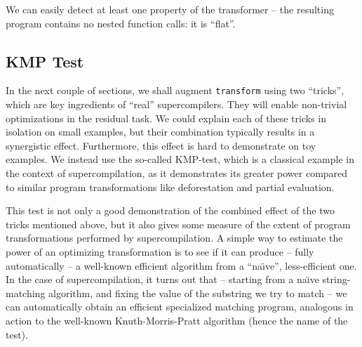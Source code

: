 We can easily detect at least one property of the transformer -- the resulting program
contains no nested function calls: it is ``flat''.

\subsection{KMP Test}

In the next couple of sections, we shall augment \texttt{transform} using two ``tricks'',
which are key ingredients of ``real'' supercompilers. They will enable
non-trivial optimizations in the residual task.
We could explain each of these tricks in isolation on small examples,
but their combination typically results in a synergistic effect.
Furthermore, this effect is hard to demonstrate on toy examples.
We instead use the so-called KMP-test, which is
a classical example in the context of supercompilation, as it demonstrates its greater
power compared to similar program transformations like deforestation and partial 
evaluation\cite{Sorensen1994TurchinSupercompiler,Sorensen1998Introduction}. 

This test is not only a good demonstration of the combined effect of the two tricks mentioned above,
but it also gives some measure of the extent of program transformations performed by supercompilation.
A simple way to estimate the power of an optimizing transformation is to see if it
can produce -- fully automatically -- a well-known efficient algorithm
from a ``na\"{\i}ve'', less-efficient one.
In the case of supercompilation, it turns out that
-- starting from a na\"{\i}ve string-matching algorithm, 
and fixing the value of the substring we try to match --
we can automatically obtain an efficient specialized matching program,
analogous in action to the well-known Knuth-Morris-Pratt algorithm \cite{Knuth1977Fast}
(hence the name of the test).

